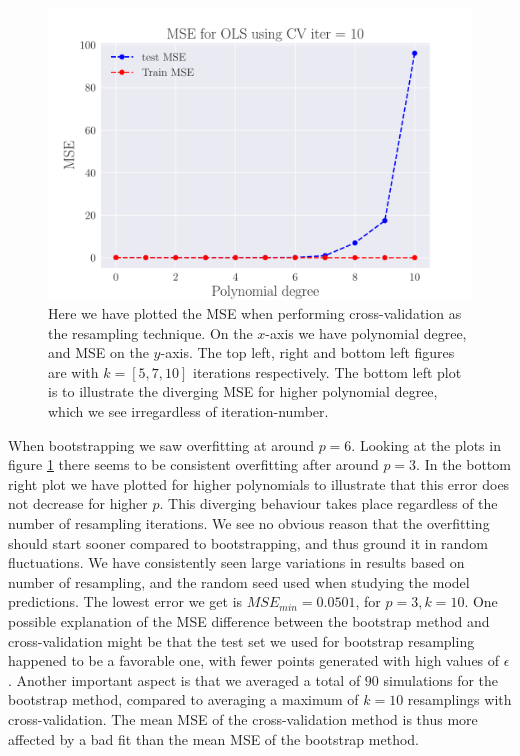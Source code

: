 \documentclass[reprint,english,notitlepage,aps,nobalancelastpage,nofootinbib]{revtex4-1}  %
\begin{document}
\begin{figure}[H]
	\endminipage\hfill
	\includegraphics[width=\linewidth]{MSE_OLS_n30_eps02_pol10_CV_re10.pdf}
	\endminipage
	\caption{Here we have plotted the MSE when performing cross-validation as the resampling technique. On the $x$-axis we have polynomial degree, and MSE on the $y$-axis. The top left, right and bottom left figures are with $k=[5, 7, 10]$ iterations respectively. The bottom left plot is to illustrate the diverging MSE for higher polynomial degree, which we see irregardless of iteration-number.} \label{fig:CV_OLS}
\end{figure}

When bootstrapping we saw overfitting at around $p=6$. Looking at the plots in figure \ref{fig:CV_OLS} there seems to be consistent overfitting after around $p=3$. In the bottom right plot we have plotted for higher polynomials to illustrate that this error does not decrease for higher $p$. This diverging behaviour takes place regardless of the number of resampling iterations. We see no obvious reason that the overfitting should start sooner compared to bootstrapping, and thus ground it in random fluctuations. We have consistently seen large variations in results based on number of resampling, and the random seed used when studying the model predictions. The lowest error we get is $MSE_{min}=0.0501$, for $p=3, k=10$. One possible explanation of the MSE difference between the bootstrap method and cross-validation might be that the test set we used for bootstrap resampling happened to be a favorable one, with fewer points generated with high values of $\epsilon$. Another important aspect is that we averaged a total of $90$ simulations for the bootstrap method, compared to averaging a maximum of $k=10$ resamplings with cross-validation. The mean MSE of the cross-validation method is thus more affected by a bad fit than the mean MSE of the bootstrap method.
\end{document}
